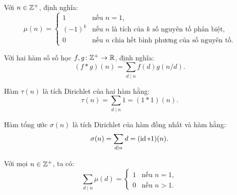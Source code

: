 \documentclass[../imo-training-open-book.tex]{subfiles}
\begin{document}
\vspace{1em}

\begin{definition*}
    \label{definition:mobius-function}
    Với \( n \in \mathbb Z^+ \), định nghĩa:
    \[
        \mu(n) =
        \begin{cases}
            1 & \text{nếu } n = 1, \\
            (-1)^k & \text{nếu } n \text{ là tích của } k \text{ số nguyên tố phân biệt}, \\
            0 & \text{nếu } n \text{ chia hết bình phương của số nguyên tố}.
        \end{cases}
    \]
\end{definition*}

\vspace{1em}

\begin{definition*}
    \label{definition:dirichlet-convolution}
    Với hai hàm số số học \( f, g \colon \mathbb Z^+ \to \mathbb R \), định nghĩa:
    \[
        (f * g)(n) = \sum_{d \mid n} f(d) g(n/d).
    \]
\end{definition*}

\vspace{1em}

\begin{theorem*}[\href{https://w.wiki/9WO3}{Đẳng thức \( \tau = 1 * 1 \)}]
    \label{theorem:tau-convolution}
    Hàm \( \tau(n) \) là tích Dirichlet của hai hàm hằng:
    \[
        \tau(n) = \sum_{d \mid n} 1 = (1 * 1)(n).
    \]
\end{theorem*}

\vspace{1em}

\begin{theorem*}[\href{https://w.wiki/9WO4}{Đẳng thức \( \sigma = \id * 1 \)}]
    \label{theorem:sigma-convolution}
    Hàm tổng ước \( \sigma(n) \) là tích Dirichlet của hàm đồng nhất và hàm hằng:
    \[
        \sigma(n) = \sum_{d \mid n} d = (\operatorname{id} * 1)(n).
    \]
\end{theorem*}

\vspace{1em}

\begin{theorem*}
    \label{theorem:sum-mu-divisors}
    Với mọi \( n \in \mathbb Z^+ \), ta có:
    \[
        \sum_{d \mid n} \mu(d) =
        \begin{cases}
            1 & \text{nếu } n = 1, \\
            0 & \text{nếu } n > 1.
        \end{cases}
    \]
\end{theorem*}
\end{document}
